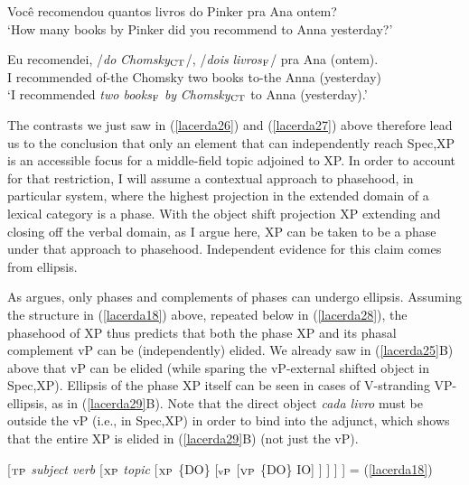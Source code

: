 \documentclass[output=paper]{langscibook}
\begin{document}
\begin{exe}
\ex \label{lacerda27}
\begin{xlist}
 \label{lacerda27A}
Você recomendou quantos livros do Pinker pra Ana ontem?\\
‘How many books by Pinker did you recommend to Anna yesterday?’	

 \label{lacerda27B}
\gll {}Eu 	recomendei, 	/\emph{do}	 \emph{Chomsky}$_{\textnormal{CT}}$/,	/\emph{dois} 	\emph{livros}$_{\textnormal{F}}$/	pra 	Ana	(ontem).\\
I 	recommended	of-the 	Chomsky 	two	books 	to-the 	Anna	(yesterday)\\
\glt‘I recommended \emph{two books}$_{\textnormal{F}}$ \emph{by} \emph{Chomsky}$_{\textnormal{CT}}$ to Anna (yesterday).’

\end{xlist}
\end{exe}

The contrasts we just saw in (\ref{lacerda26}) and (\ref{lacerda27}) above therefore lead us to the conclusion that only an element that can independently reach Spec,XP is an accessible focus for a middle-field topic adjoined to XP. In order to account for that restriction, I will assume a contextual approach to phasehood, in particular \citet{boskovic2014} system, where the highest projection in the extended domain of a lexical category is a phase. With the object shift projection XP extending and closing off the verbal domain, as I argue here, XP can be taken to be a phase under that approach to phasehood. Independent evidence for this claim comes from ellipsis.

As  \citeyear{boskovic2014} argues, only phases and complements of phases can undergo ellipsis. Assuming the structure in (\ref{lacerda18}) above, repeated below in (\ref{lacerda28}), the phasehood of XP thus predicts that both the phase XP and its phasal complement vP can be (independently) elided. We already saw in (\ref{lacerda25}B) above that vP can be elided (while sparing the vP-external shifted object in Spec,XP). Ellipsis of the phase XP itself can be seen in cases of V-stranding VP-ellipsis, as in (\ref{lacerda29}B). Note that the direct object \emph{cada livro} must be outside the vP (i.e., in Spec,XP) in order to bind into the adjunct, which shows that the entire XP is elided in (\ref{lacerda29}B) (not just the vP).

\begin{exe}
\ex \label{lacerda28}
[$_{\textnormal{TP}}$ \emph{subject verb} [$_{\textnormal{XP}}$ \emph{topic} [$_{\textnormal{XP}}$ \{DO\} [$_{\textnormal{vP}}$ [$_{\textnormal{VP}}$ \{DO\} IO] ] ] ] ] = (\ref{lacerda18})

\end{exe}
\end{document}

